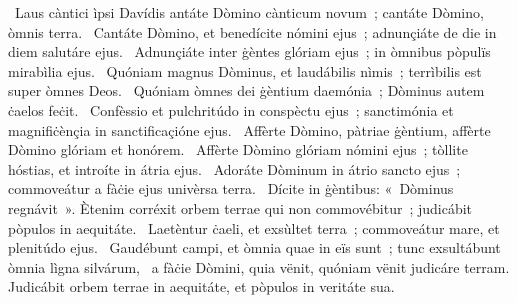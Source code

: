 {~Laus càntici ìpsi Davídis}
{%
antáte Dòmino cànticum novum~; cantáte Dòmino, òmnis terra.
~Cantáte Dòmino, et benedícite nómini ejus~; adnunçiáte de die in diem salutáre ejus.
~Adnunçiáte inter ġèntes glóriam ejus~; in òmnibus pòpulïs mirabìlia ejus.
~Quóniam magnus Dòminus, et laudábilis nìmis~; terrìbilis est super òmnes Deos.
~Quóniam òmnes dei ġèntium daemónia~; Dòminus autem ċaelos feċit.
~Confèssio et pulchritúdo in conspèctu ejus~; sanctimónia et magnifiċènçia in sanctificaçióne ejus.
~Affèrte Dòmino, pàtriae ġèntium, affèrte Dòmino glóriam et honórem.
~Affèrte Dòmino glóriam nómini ejus~; tòllite hóstias, et introíte in átria ejus.
~Adoráte Dòminum in átrio sancto ejus~; commoveátur a fàċie ejus univèrsa terra.
~Dícite in ġèntibus: «~Dòminus regnávit~». Ètenim corréxit orbem terrae qui non commovébitur~; judicábit pòpulos in aequitáte.
~Laetèntur ċaeli, et exsùltet terra~; commoveátur mare, et plenitúdo ejus.
~Gaudébunt campi, et òmnia quae in eïs sunt~; tunc exsultábunt òmnia lìgna silvárum,
~a fàċie Dòmini, quia vënit, quóniam vënit judicáre terram. Judicábit orbem terrae in aequitáte, et pòpulos in veritáte sua.
}

